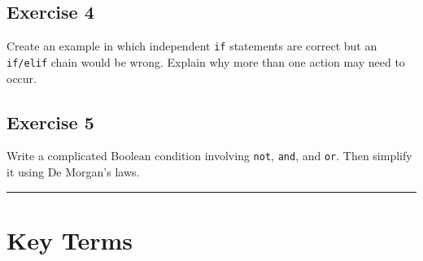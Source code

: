 \documentclass[
  11pt,
  a4paper,
]{article}
\begin{document}
\subsection{Exercise 4}\label{exercise-4}

Create an example in which independent \texttt{if} statements are
correct but an \texttt{if/elif} chain would be wrong. Explain why more
than one action may need to occur.

\subsection{Exercise 5}\label{exercise-5}

Write a complicated Boolean condition involving \texttt{not},
\texttt{and}, and \texttt{or}. Then simplify it using De Morgan's laws.

\begin{center}\rule{0.5\linewidth}{0.5pt}\end{center}

\section{Key Terms}\label{key-terms}
\end{document}
